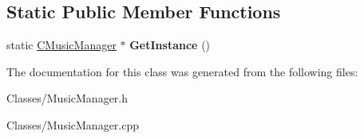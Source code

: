 \subsection*{Static Public Member Functions}
\begin{DoxyCompactItemize}
\item 
static \hyperlink{class_c_music_manager}{C\+Music\+Manager} $\ast$ {\bfseries Get\+Instance} ()\hypertarget{class_c_music_manager_abc2734df40c28a5a31563f28adea64b1}{}\label{class_c_music_manager_abc2734df40c28a5a31563f28adea64b1}

\end{DoxyCompactItemize}


The documentation for this class was generated from the following files\+:\begin{DoxyCompactItemize}
\item 
Classes/Music\+Manager.\+h\item 
Classes/Music\+Manager.\+cpp\end{DoxyCompactItemize}

